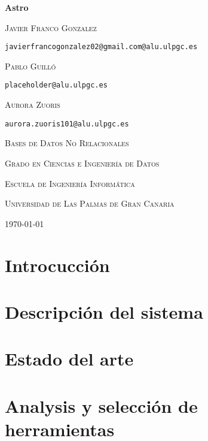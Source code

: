 \documentclass[spanish]{article}
\begin{document}
\begin{titlepage}
	\centering
	{\huge\bfseries Astro \par}
	\vspace{1cm}
	{\scshape\Large Javier Franco Gonzalez \par\tt{javierfrancogonzalez02@gmail.com@alu.ulpgc.es}\par}
	\vspace{1cm}
	{\scshape\Large Pablo Guilló \par\tt{placeholder@alu.ulpgc.es}\par}
	\vspace{1cm}
	{\scshape\Large Aurora Zuoris \par\tt{aurora.zuoris101@alu.ulpgc.es}\par}
	\vspace{3cm}
	{\scshape\large Bases de Datos No Relacionales \par}
	\vspace{1cm}
	{\scshape\large Grado en Ciencias e Ingeniería de Datos\par}
	\vspace{1cm}
	{\scshape\large Escuela de Ingeniería Informática\par}
	\vspace{1cm}
	{\scshape\large Universidad de Las Palmas de Gran Canaria\par}
	\vspace{1cm}
	{\scshape\large \today{} \par}
\end{titlepage}

\tableofcontents

\section{Introcucción}

\section{Descripción del sistema}

\section{Estado del arte}

\section{Analysis y selección de herramientas}
\end{document}
